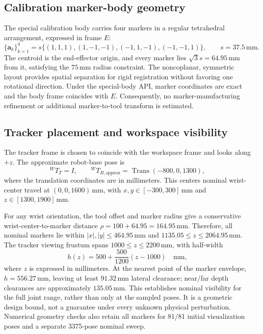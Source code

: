 \subsection{Calibration marker-body geometry}

The special calibration body carries four markers in a regular
tetrahedral arrangement, expressed in frame $E$:
\begin{equation}
 \{\mathbf a_k\}_{k=1}^{4}
 =s\{(1,1,1),(1,-1,-1),(-1,1,-1),(-1,-1,1)\},
 \qquad s=37.5\,\mathrm{mm}.
 \label{eq:marker-layout}
\end{equation}
The centroid is the end-effector origin, and every marker lies
$\sqrt{3}s=64.95\,\mathrm{mm}$ from it, satisfying the
$75\,\mathrm{mm}$ radius constraint. The noncoplanar, symmetric layout
provides spatial separation for rigid registration without favoring
one rotational direction. Under the special-body API, marker coordinates
are exact and the body frame coincides with $E$. Consequently, no
marker-manufacturing refinement or additional marker-to-tool transform
is estimated.

\subsection{Tracker placement and workspace visibility}

The tracker frame is chosen to coincide with the workspace frame and
looks along $+z$. The approximate robot-base pose is
\begin{equation}
 {}^{W}T_T=I,
 \qquad {}^{W}T_{B,\mathrm{approx}}
 =\operatorname{Trans}(-800,0,1300),
 \label{eq:scene-placement}
\end{equation}
where the translation coordinates are in millimeters.
This centers nominal wrist-center travel at $(0,0,1600)\,\mathrm{mm}$,
with $x,y\in[-300,300]\,\mathrm{mm}$ and
$z\in[1300,1900]\,\mathrm{mm}$.

For any wrist orientation, the tool offset and marker radius give a
conservative wrist-center-to-marker distance
$\rho=100+64.95=164.95\,\mathrm{mm}$. Therefore, all nominal markers lie
within $|x|,|y|\leq464.95\,\mathrm{mm}$ and
$1135.05\leq z\leq2064.95\,\mathrm{mm}$.
The tracker viewing frustum spans $1000\leq z\leq2200\,\mathrm{mm}$,
with half-width
\begin{equation}
 h(z)=500+\frac{500}{1200}(z-1000)\quad\mathrm{mm},
 \label{eq:tracker-frustum}
\end{equation}
where $z$ is expressed in millimeters. At the nearest point of the marker
envelope, $h=556.27\,\mathrm{mm}$, leaving at least
$91.32\,\mathrm{mm}$ lateral clearance; near/far depth clearances are
approximately $135.05\,\mathrm{mm}$. This establishes nominal visibility
for the full joint range, rather than only at the sampled poses.
It is a geometric design bound, not a guarantee under every unknown
physical perturbation. Numerical geometry checks also retain all markers
for 81/81 initial visualization poses and a separate 3375-pose nominal sweep.

